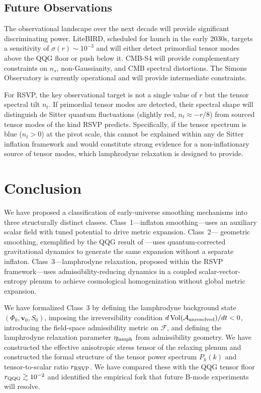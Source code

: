 \documentclass[12pt, a4paper]{article}
\newcommand{\vv}{\mathbf{v}}
\newcommand{\calA}{\mathcal{A}}
\newcommand{\calF}{\mathcal{F}}
\newcommand{\etalamph}{\eta_{\rm lamph}}
\newcommand{\rRSVP}{r_{\rm RSVP}}
\newcommand{\rQQG}{r_{\rm QQG}}
\newcommand{\Ph}{P_h}
\newcommand{\Vol}{\operatorname{Vol}}
\begin{document}
\subsection{Future Observations}

The observational landscape over the next decade will provide significant
discriminating power. LiteBIRD, scheduled for launch in the early 2030s, targets
a sensitivity of $\sigma(r) \sim 10^{-3}$ and will either detect primordial tensor
modes above the QQG floor or push below it. CMB-S4 will provide complementary
constraints on $n_s$, non-Gaussianity, and CMB spectral distortions. The Simons
Observatory is currently operational and will provide intermediate constraints.

For RSVP, the key observational target is not a single value of $r$ but the
tensor spectral tilt $n_t$. If primordial tensor modes are detected, their spectral
shape will distinguish de Sitter quantum fluctuations (slightly red, $n_t \approx
-r/8$) from sourced tensor modes of the kind RSVP predicts. Specifically, if the
tensor spectrum is blue ($n_t > 0$) at the pivot scale, this cannot be explained
within any de Sitter inflation framework and would constitute strong evidence for
a non-inflationary source of tensor modes, which lamphrodyne relaxation is
designed to provide.

\section{Conclusion}
\label{sec:conclusion}

We have proposed a classification of early-universe smoothing mechanisms into
three structurally distinct classes. Class~1---inflaton smoothing---uses an
auxiliary scalar field with tuned potential to drive metric expansion. Class~2---
geometric smoothing, exemplified by the QQG result of \citet{Liu2026}---uses
quantum-corrected gravitational dynamics to generate the same expansion without a
separate inflaton. Class~3---lamphrodyne relaxation, proposed within the RSVP
framework---uses admissibility-reducing dynamics in a coupled scalar-vector-entropy
plenum to achieve cosmological homogenization without global metric expansion.

We have formalized Class~3 by defining the lamphrodyne background state $(\Phi_0,
\vv_0, S_0)$, imposing the irreversibility condition
$d\Vol(\calA_{\rm unresolved})/dt < 0$, introducing the field-space admissibility
metric on $\calF$, and defining the lamphrodyne relaxation parameter $\etalamph$
from admissibility geometry. We have constructed the effective anisotropic stress
tensor of the relaxing plenum and constructed the formal structure of the tensor power spectrum
$\Ph(k)$ and tensor-to-scalar ratio $\rRSVP$. We have compared these with the
QQG tensor floor $\rQQG \gtrsim 10^{-2}$ and identified the empirical fork that
future B-mode experiments will resolve.
\end{document}
